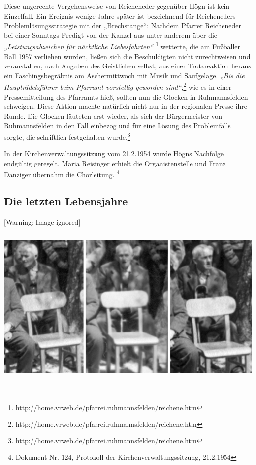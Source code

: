 \documentclass[a4paper]{article}
\newcommand\textstyleZitate[1]{\textit{#1}}
\begin{document}
Diese ungerechte Vorgehensweise von Reicheneder gegenüber Högn ist kein
Einzelfall. Ein Ereignis wenige Jahre später ist bezeichnend für
Reicheneders Problemlösungsstrategie mit der „Brechstange“: Nachdem
Pfarrer Reicheneder bei einer Sonntags-Predigt von der Kanzel aus unter
anderem über die \textstyleZitate{„Leistungsabzeichen für nächtliche
Liebesfahrten“} \footnote{
http://home.vrweb.de/pfarrei.ruhmannsfelden/reichene.htm} wetterte, die
am Fußballer Ball 1957 verliehen wurden, ließen sich die Beschuldigten
nicht zurechtweisen und veranstalten, nach Angaben des Geistlichen
selbst, aus einer Trotzreaktion heraus ein Faschingsbegräbnis am
Aschermittwoch mit Musik und Saufgelage. \textstyleZitate{„Bis die
Haupträdelsführer beim Pfarramt vorstellig geworden sind“;}\footnote{
http://home.vrweb.de/pfarrei.ruhmannsfelden/reichene.htm} wie es in
einer Pressemitteilung des Pfarramts hieß, sollten nun die Glocken in
Ruhmannsfelden schweigen. Diese Aktion machte natürlich nicht nur in
der regionalen Presse ihre Runde. Die Glocken läuteten erst wieder, als
sich der Bürgermeister von Ruhmannsfelden in den Fall einbezog und für
eine Lösung des Problemfalls sorgte, die schriftlich festgehalten
wurde.\footnote{
http://home.vrweb.de/pfarrei.ruhmannsfelden/reichene.htm}

In der Kirchenverwaltungssitzung vom 21.2.1954 wurde Högns Nachfolge
endgültig geregelt. Maria Reisinger erhielt die Organistenstelle und
Franz Danziger übernahm die Chorleitung. \footnote{Dokument Nr. 124,
Protokoll der Kirchenverwaltungssitzung, 21.2.1954}

\subsection{Die letzten Lebensjahre}
\hypertarget{RefHeadingToc100333738}{}  [Warning: Image ignored]
\includegraphics[width=15.981cm,height=8.56cm]{pictures/zulassungsarbeit-img053.jpg}
\end{document}
